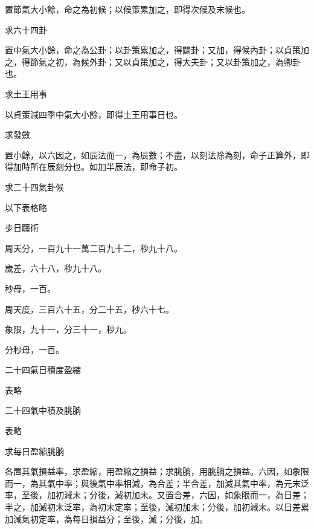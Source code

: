 \begin{pinyinscope}
 置節氣大小餘，命之為初候；以候策累加之，即得次候及末候也。



 求六十四卦



 置中氣大小餘，命之為公卦；以卦策累加之，得闢卦；又加，得候內卦；以貞策加之，得節氣之初，為候外卦；又以貞策加之，得大夫卦；又以卦策加之，為卿卦也。



 求土王用事



 以貞策減四季中氣大小餘，即得土王用事日也。



 求發斂



 置小餘，以六因之，如辰法而一，為辰數；不盡，以刻法除為刻，命子正算外，即得加時所在辰刻分也。如加半辰法，即命子初。



 求二十四氣卦候



 以下表格略



 步日躔術



 周天分，一百九十一萬二百九十二，秒九十八。



 歲差，六十八，秒九十八。



 秒母，一百。



 周天度，三百六十五，分二十五，秒六十七。



 象限，九十一，分三十一，秒九。



 分秒母，一百。



 二十四氣日積度盈縮



 表略



 二十四氣中積及朓朒



 表略



 求每日盈縮朓朒



 各置其氣損益率，求盈縮，用盈縮之損益；求朓朒，用朓朒之損益。六因，如象限而一，為其氣中率；與後氣中率相減，為合差；半合差，加減其氣中率，為元末泛率，至後，加初減末；分後，減初加末。又置合差，六因，如象限而一，為日差；半之，加減初末泛率，為初末定率；至後，減初加末；分後，加初減末。以日差累加減氣初定率，為每日損益分；至後，減；分後，加。




\end{pinyinscope}
